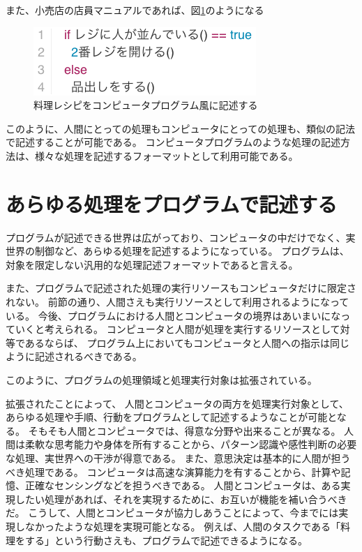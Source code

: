 また、小売店の店員マニュアルであれば、図\ref{fig:background_retail}のようになる

\begin{figure}[htbp]
  \begin{center}
  \includegraphics[width=.4\linewidth,bb=0 0 319 98]{images/background_retail.js.png}
  \end{center}
  \caption{料理レシピをコンピュータプログラム風に記述する}
  \label{fig:background_retail}
\end{figure}

このように、人間にとっての処理もコンピュータにとっての処理も、類似の記法で記述することが可能である。
コンピュータプログラムのような処理の記述方法は、様々な処理を記述するフォーマットとして利用可能である。

\section{あらゆる処理をプログラムで記述する}\label{ux3042ux3089ux3086ux308bux51e6ux7406ux3092ux30d7ux30edux30b0ux30e9ux30e0ux3067ux8a18ux8ff0ux3059ux308b}

プログラムが記述できる世界は広がっており、コンピュータの中だけでなく、実世界の制御など、あらゆる処理を記述するようになっている。
プログラムは、対象を限定しない汎用的な処理記述フォーマットであると言える。

また、プログラムで記述された処理の実行リソースもコンピュータだけに限定されない。
前節の通り、人間さえも実行リソースとして利用されるようになっている。
今後、プログラムにおける人間とコンピュータの境界はあいまいになっていくと考えられる。
コンピュータと人間が処理を実行するリソースとして対等であるならば、
プログラム上においてもコンピュータと人間への指示は同じように記述されるべきである。

\cite{man-computer-symbiosis}
このように、プログラムの処理領域と処理実行対象は拡張されている。

拡張されたことによって、
人間とコンピュータの両方を処理実行対象として、あらゆる処理や手順、行動をプログラムとして記述するようなことが可能となる。
そもそも人間とコンピュータでは、得意な分野や出来ることが異なる。
人間は柔軟な思考能力や身体を所有することから、パターン認識や感性判断の必要な処理、実世界への干渉が得意である。
また、意思決定は基本的に人間が担うべき処理である。
コンピュータは高速な演算能力を有することから、計算や記憶、正確なセンシングなどを担うべきである。
人間とコンピュータは、ある実現したい処理があれば、それを実現するために、お互いが機能を補い合うべきだ。
こうして、人間とコンピュータが協力しあうことによって、今までには実現しなかったような処理を実現可能となる。
例えば、人間のタスクである「料理をする」という行動さえも、プログラムで記述できるようになる。

